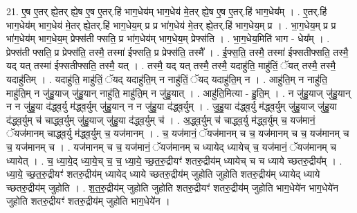 \documentclass[17pt]{extarticle}
\begin{document}
21. ए॒ष ए॒तर् ह्ये॒तर् ह्ये॒ष ए॒ष ए॒तर्.हि॑ भाग॒धेय॑म् भाग॒धेय॑ मे॒तर् ह्ये॒ष ए॒ष ए॒तर्.हि॑ भाग॒धेय᳚म् । . ए॒तर्.हि॑ भाग॒धेय॑म् भाग॒धेय॑ मे॒तर् ह्ये॒तर्.हि॑ भाग॒धेय॒म् प्र प्र भा॑ग॒धेय॑ मे॒तर् ह्ये॒तर्.हि॑ भाग॒धेय॒म् प्र । . भा॒ग॒धेय॒म् प्र प्र भा॑ग॒धेय॑म् भाग॒धेय॒म् प्रेफ्स॑ती फ्सति॒ प्र भा॑ग॒धेय॑म् भाग॒धेय॒म् प्रेफ्स॑ति । . भा॒ग॒धेय॒मिति॑ भाग - धेय᳚म् । . प्रेफ्स॑ती फ्सति॒ प्र प्रेफ्स॑ति॒ तस्मै॒ तस्मा॑ ईफ्सति॒ प्र प्रेफ्स॑ति॒ तस्मै᳚ । . ई॒फ्स॒ति॒ तस्मै॒ तस्मा॑ ईफ्सतीफ्सति॒ तस्मै॒ यद् यत् तस्मा॑ ईफ्सतीफ्सति॒ तस्मै॒ यत् । . तस्मै॒ यद् यत् तस्मै॒ तस्मै॒ यदाहु॑ति॒ माहु॑तिं॒ ॅयत् तस्मै॒ तस्मै॒ यदाहु॑तिम् । . यदाहु॑ति॒ माहु॑तिं॒ ॅयद् यदाहु॑ति॒म् न नाहु॑तिं॒ ॅयद् यदाहु॑ति॒म् न । . आहु॑ति॒म् न नाहु॑ति॒ माहु॑ति॒म् न जु॑हु॒याज् जु॑हु॒यान् नाहु॑ति॒ माहु॑ति॒म् न जु॑हु॒यात् । . आहु॑ति॒मित्या - हु॒ति॒म् । . न जु॑हु॒याज् जु॑हु॒यान् न न जु॑हु॒या द॑द्ध्व॒र्यु म॑द्ध्व॒र्युम् जु॑हु॒यान् न न जु॑हु॒या द॑द्ध्व॒र्युम् । . जु॒हु॒या द॑द्ध्व॒र्यु म॑द्ध्व॒र्युम् जु॑हु॒याज् जु॑हु॒या द॑द्ध्व॒र्युम् च॑ चाद्ध्व॒र्युम् जु॑हु॒याज् जु॑हु॒या द॑द्ध्व॒र्युम् च॑ । . अ॒द्ध्व॒र्युम् च॑ चाद्ध्व॒र्यु म॑द्ध्व॒र्युम् च॒ यज॑मानं॒ ॅयज॑मानम् चाद्ध्व॒र्यु म॑द्ध्व॒र्युम् च॒ यज॑मानम् । . च॒ यज॑मानं॒ ॅयज॑मानम् च च॒ यज॑मानम् च च॒ यज॑मानम् च च॒ यज॑मानम् च । . यज॑मानम् च च॒ यज॑मानं॒ ॅयज॑मानम् च ध्यायेद् ध्यायेच् च॒ यज॑मानं॒ ॅयज॑मानम् च ध्यायेत् । . च॒ ध्या॒ये॒द् ध्या॒ये॒च् च॒ च॒ ध्या॒ये॒ च्छ॒त॒रु॒द्रीयꣳ॑ शतरु॒द्रीय॑म् ध्यायेच् च च ध्याये च्छतरु॒द्रीय᳚म् । . ध्या॒ये॒ च्छ॒त॒रु॒द्रीयꣳ॑ शतरु॒द्रीय॑म् ध्यायेद् ध्याये च्छतरु॒द्रीय॑म् जुहोति जुहोति शतरु॒द्रीय॑म् ध्यायेद् ध्याये च्छतरु॒द्रीय॑म् जुहोति । . श॒त॒रु॒द्रीय॑म् जुहोति जुहोति शतरु॒द्रीयꣳ॑ शतरु॒द्रीय॑म् जुहोति भाग॒धेये॑न भाग॒धेये॑न जुहोति शतरु॒द्रीयꣳ॑ शतरु॒द्रीय॑म् जुहोति भाग॒धेये॑न । \newline
\end{document}
